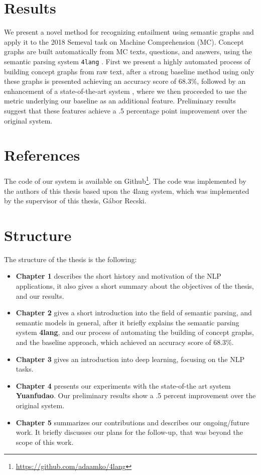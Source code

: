 \section{Results}
We present a novel method for recognizing entailment using semantic
graphs and apply it to the 2018 Semeval task on Machine
Comprehension (MC).
Concept graphs are built automatically from MC texts, questions, and answers,
using the semantic parsing system \texttt{4lang} \cite{Recski:2016d}.
First we present a highly automated process of building concept graphs from raw text, after
a strong baseline method using only these graphs is presented achieving an accuracy score of $68.3\%$,
followed by an enhancement of a state-of-the-art system
\cite{Wang:2018}, where we then proceeded to use the metric underlying our baseline as an
additional feature. Preliminary results suggest that these features
achieve a .5 percentage point improvement over the original system.

\section{References}
The code of our system is available on Github\footnote{\url{https://github.com/adaamko/4lang}}. The code was implemented by the authors of this thesis based upon the 4lang system, which was implemented by the supervisor of this thesis, Gábor Recski.

\section{Structure}
The structure of the thesis is the following:
\begin{itemize}
	\item \textbf{Chapter 1} describes the short history and motivation of the NLP applications, it also gives a short summary about the objectives of the thesis, and our results.
	\item \textbf{Chapter 2} gives a short introduction into the field of semantic parsing, and semantic models in general, after it briefly explains the semantic parsing system \textbf{4lang}, and our process of automating the building of concept graphs, and the baseline approach, which achieved an accuracy score of $68.3\%$.
	\item \textbf{Chapter 3} gives an introduction into deep learning, focusing on the NLP tasks.
	\item \textbf{Chapter 4} presents our experiments with the state-of-the art system \textbf{Yuanfudao}. Our preliminary results show a .5 percent improvement over the original system.
	\item \textbf{Chapter 5} summarizes our contributions and describes our ongoing/future work. It briefly discusses our plans for the follow-up, that was beyond the scope of this work.
\end{itemize}